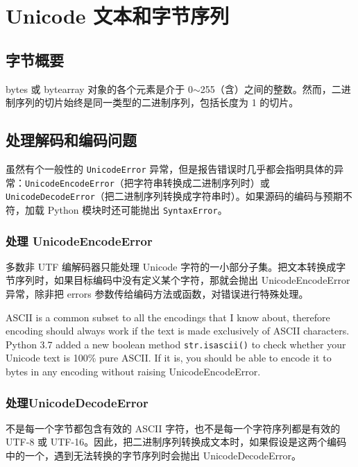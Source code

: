 \chapter{Unicode 文本和字节序列\label{Ch04}}
\section{字节概要}
bytes 或 bytearray 对象的各个元素是介于 0$\sim$255（含）之间的整数。然而，二进制序列的切片始终是同一类型的二进制序列，包括长度为 1 的切片。
\section{处理解码和编码问题}
虽然有个一般性的 \verb|UnicodeError| 异常，但是报告错误时几乎都会指明具体的异常：\verb|UnicodeEncodeError|（把字符串转换成二进制序列时）或 \verb|UnicodeDecodeError|（把二进制序列转换成字符串时）。如果源码的编码与预期不符，加载 Python 模块时还可能抛出 \verb|SyntaxError|。
\subsection{处理 UnicodeEncodeError}
多数非 UTF 编解码器只能处理 Unicode 字符的一小部分子集。把文本转换成字节序列时，如果目标编码中没有定义某个字符，那就会抛出 UnicodeEncodeError 异常，除非把 errors 参数传给编码方法或函数，对错误进行特殊处理。

ASCII is a common subset to all the encodings that I know about, therefore encoding should always work if the text is made exclusively of ASCII characters. Python 3.7 added a new boolean method \verb|str.isascii()| to check whether your Unicode text is 100\% pure ASCII. If it is, you should be able to encode it to bytes in any encoding without raising UnicodeEncodeError.

\subsection{处理UnicodeDecodeError}
不是每一个字节都包含有效的 ASCII 字符，也不是每一个字符序列都是有效的 UTF-8 或 UTF-16。因此，把二进制序列转换成文本时，如果假设是这两个编码中的一个，遇到无法转换的字节序列时会抛出 UnicodeDecodeError。